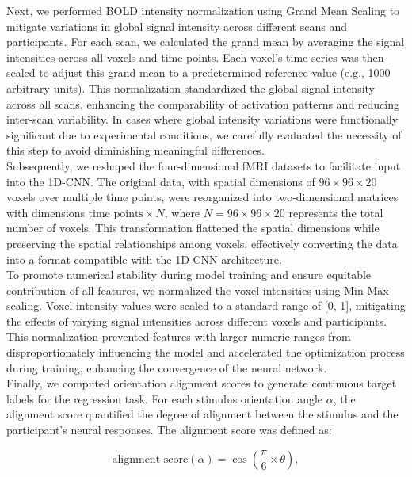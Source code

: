 \documentclass[a4paper]{article}
\begin{document}
\noindent Next, we performed BOLD intensity normalization using Grand Mean Scaling to mitigate variations in global signal intensity across different scans and participants. For each scan, we calculated the grand mean by averaging the signal intensities across all voxels and time points. Each voxel's time series was then scaled to adjust this grand mean to a predetermined reference value (e.g., 1000 arbitrary units). This normalization standardized the global signal intensity across all scans, enhancing the comparability of activation patterns and reducing inter-scan variability. In cases where global intensity variations were functionally significant due to experimental conditions, we carefully evaluated the necessity of this step to avoid diminishing meaningful differences.\\

\noindent Subsequently, we reshaped the four-dimensional fMRI datasets to facilitate input into the 1D-CNN. The original data, with spatial dimensions of \(96 \times 96 \times 20\) voxels over multiple time points, were reorganized into two-dimensional matrices with dimensions \(\text{time points} \times N\), where \(N = 96 \times 96 \times 20\) represents the total number of voxels. This transformation flattened the spatial dimensions while preserving the spatial relationships among voxels, effectively converting the data into a format compatible with the 1D-CNN architecture.\\

\noindent To promote numerical stability during model training and ensure equitable contribution of all features, we normalized the voxel intensities using Min-Max scaling. Voxel intensity values were scaled to a standard range of [0, 1], mitigating the effects of varying signal intensities across different voxels and participants. This normalization prevented features with larger numeric ranges from disproportionately influencing the model and accelerated the optimization process during training, enhancing the convergence of the neural network.\\

\noindent Finally, we computed orientation alignment scores to generate continuous target labels for the regression task. For each stimulus orientation angle \(\alpha\), the alignment score quantified the degree of alignment between the stimulus and the participant's neural responses. The alignment score was defined as:

\begin{equation}
\text{alignment score}(\alpha) = \cos\left( \frac{\pi}{6} \times \theta \right),
\label{eq:alignment_score}
\end{equation}
\end{document}
